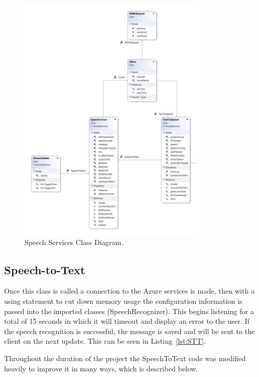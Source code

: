 \begin{figure}[h!]
	\caption{Speech Services Class Diagram.}
	\label{image:SpeechServices}
	\centering
	\includegraphics[width=0.8\textwidth]{Images/ClassDiagram STT and TTS.png}
\end{figure}

\subsection{Speech-to-Text}
Once this class is called a connection to the Azure services is made, then with a using statement to cut down memory usage the configuration information is passed into the imported classes (SpeechRecognizer). This begins listening for a total of 15 seconds in which it will timeout and display an error to the user. If the speech recognition is successful, the message is saved and will be sent to the client on the next update. This can be seen in Listing~\ref{lst:STT}.

\par
\medskip

Throughout the duration of the project the SpeechToText code was modified heavily to improve it in many ways, which is described below.

